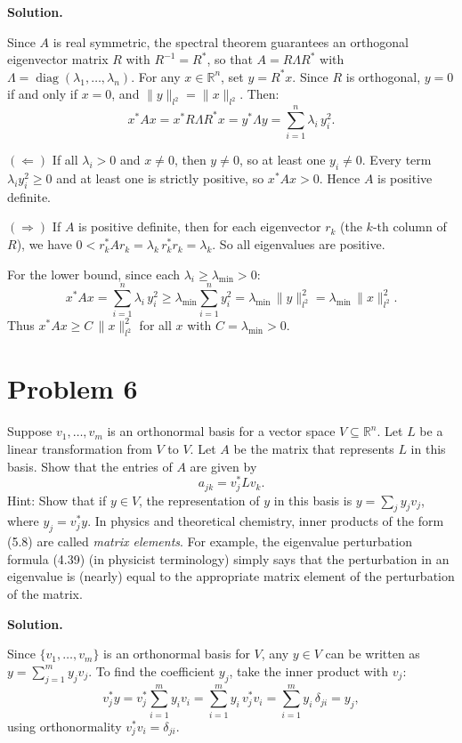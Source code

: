 \documentclass[letterpaper, 11pt]{article}
\newcommand{\R}{\mathbb{R}}   %
\newcommand{\1}{\mathds{1}}	%
\DeclareMathOperator*{\diag}{diag}        %
\theoremstyle{definition}
\begin{document}
\medskip

\textbf{Solution.}

Since $A$ is real symmetric, the spectral theorem guarantees an orthogonal eigenvector matrix $R$ with $R^{-1} = R^*$, so that $A = R\Lambda R^*$ with $\Lambda = \diag(\lambda_1, \ldots, \lambda_n)$. For any $x \in \R^n$, set $y = R^* x$. Since $R$ is orthogonal, $y = 0$ if and only if $x = 0$, and $\|y\|_{l^2} = \|x\|_{l^2}$. Then:
\[
x^*Ax = x^*R\Lambda R^*x = y^*\Lambda y = \sum_{i=1}^n \lambda_i\, y_i^2.
\]

$(\Leftarrow)$ If all $\lambda_i > 0$ and $x \neq 0$, then $y \neq 0$, so at least one $y_i \neq 0$. Every term $\lambda_i y_i^2 \geq 0$ and at least one is strictly positive, so $x^*Ax > 0$. Hence $A$ is positive definite.

$(\Rightarrow)$ If $A$ is positive definite, then for each eigenvector $r_k$ (the $k$-th column of $R$), we have $0 < r_k^* A r_k = \lambda_k\, r_k^* r_k = \lambda_k$. So all eigenvalues are positive.

For the lower bound, since each $\lambda_i \geq \lambda_{\min} > 0$:
\[
x^*Ax = \sum_{i=1}^n \lambda_i\, y_i^2 \geq \lambda_{\min}\sum_{i=1}^n y_i^2 = \lambda_{\min}\,\|y\|_{l^2}^2 = \lambda_{\min}\,\|x\|_{l^2}^2.
\]
Thus $x^*Ax \geq C\,\|x\|_{l^2}^2$ for all $x$ with $C = \lambda_{\min} > 0$.
\section*{Problem 6}

Suppose $v_1, \ldots, v_m$ is an orthonormal basis for a vector space $V \subseteq \R^n$. Let $L$ be a linear transformation from $V$ to $V$. Let $A$ be the matrix that represents $L$ in this basis. Show that the entries of $A$ are given by
\[
a_{jk} = v_j^* L v_k. \tag{5.8}
\]
Hint: Show that if $y \in V$, the representation of $y$ in this basis is $y = \sum_j y_j v_j$, where $y_j = v_j^* y$. In physics and theoretical chemistry, inner products of the form (5.8) are called \textit{matrix elements}. For example, the eigenvalue perturbation formula (4.39) (in physicist terminology) simply says that the perturbation in an eigenvalue is (nearly) equal to the appropriate matrix element of the perturbation of the matrix.

\textbf{Solution.}

Since $\{v_1, \ldots, v_m\}$ is an orthonormal basis for $V$, any $y \in V$ can be written as $y = \sum_{j=1}^m y_j v_j$. To find the coefficient $y_j$, take the inner product with $v_j$:
\[
v_j^* y = v_j^* \sum_{i=1}^m y_i v_i = \sum_{i=1}^m y_i\, v_j^* v_i = \sum_{i=1}^m y_i\, \delta_{ji} = y_j,
\]
using orthonormality $v_j^* v_i = \delta_{ji}$.
\end{document}
